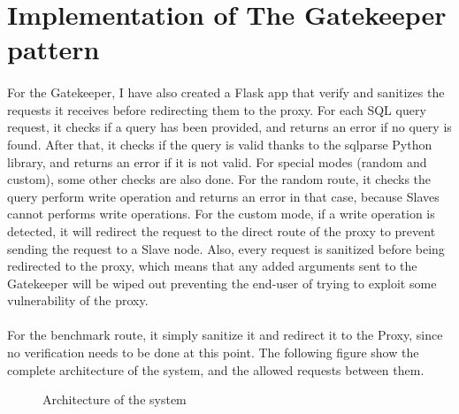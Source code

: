 \section{Implementation of The Gatekeeper pattern} \label{T2}

\paragraph{}For the Gatekeeper, I have also created a Flask app that verify and sanitizes the requests it receives before redirecting them to the proxy. For each SQL query request, it checks if a query has been provided, and returns an error if no query is found. After that, it checks if the query is valid thanks to the sqlparse Python library, and returns an error if it is not valid. For special modes (random and custom), some other checks are also done. For the random route, it checks the query perform write operation and returns an error in that case, because Slaves cannot performs write operations. For the custom mode, if a write operation is detected, it will redirect the request to the direct route of the proxy to prevent sending the request to a Slave node. Also, every request is sanitized before being redirected to the proxy, which means that any added arguments sent to the Gatekeeper will be wiped out preventing the end-user of trying to exploit some vulnerability of the proxy.

\paragraph{}For the benchmark route, it simply sanitize it and redirect it to the Proxy, since no verification needs to be done at this point. The following figure show the complete architecture of the system, and the allowed requests between them.\\

\begin{figure}[htbp]
  \centering
  
  \caption{Architecture of the system}
\end{figure}\\
